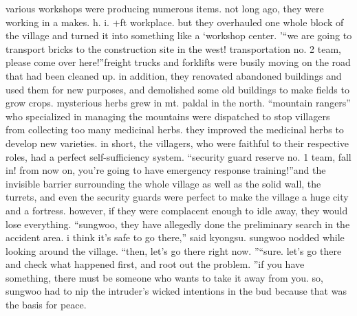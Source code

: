 various workshops were producing numerous items.
 not long ago, they were working in a makes.
h.
i.
+ft workplace.
 but they overhauled one whole block of the village and turned it into something like a ‘workshop center.
'“we are going to transport bricks to the construction site in the west! transportation no.
 2 team, please come over here!”freight trucks and forklifts were busily moving on the road that had been cleaned up.
in addition, they renovated abandoned buildings and used them for new purposes, and demolished some old buildings to make fields to grow crops.
mysterious herbs grew in mt.
 paldal in the north.
 “mountain rangers” who specialized in managing the mountains were dispatched to stop villagers from collecting too many medicinal herbs.
 they improved the medicinal herbs to develop new varieties.
in short, the villagers, who were faithful to their respective roles, had a perfect self-sufficiency system.
“security guard reserve no.
 1 team, fall in! from now on, you're going to have emergency response training!”and the invisible barrier surrounding the whole village as well as the solid wall, the turrets, and even the security guards were perfect to make the village a huge city and a fortress.
however, if they were complacent enough to idle away, they would lose everything.
“sungwoo, they have allegedly done the preliminary search in the accident area.
 i think it's safe to go there,” said kyongsu.
sungwoo nodded while looking around the village.
“then, let's go there right now.
”“sure.
 let's go there and check what happened first, and root out the problem.
”if you have something, there must be someone who wants to take it away from you.
so, sungwoo had to nip the intruder's wicked intentions in the bud because that was the basis for peace.


 